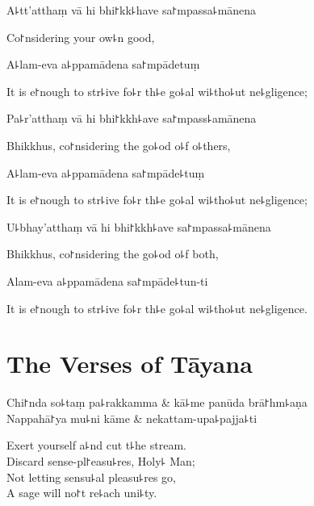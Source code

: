 A꜕tt'atthaṃ vā hi bhi꜓kk꜕have sa꜓mpassa꜕mānena

\begin{english}
  Co꜓nsidering your ow꜕n good,
\end{english}

A꜕lam-eva a꜕ppamādena sa꜓mpādetuṃ

\begin{english}
  It is e꜓nough to str꜕ive fo꜕r th꜕e go꜕al wi꜕tho꜕ut ne꜕gligence;
\end{english}

Pa꜕r'atthaṃ vā hi bhi꜓kkh꜕ave sa꜓mpass꜕amānena

\begin{english}
  Bhikkhus, co꜓nsidering the go꜕od o꜕f o꜕thers,
\end{english}

A꜕lam-eva a꜕ppamādena sa꜓mpāde꜕tuṃ

\begin{english}
  It is e꜓nough to str꜕ive fo꜕r th꜕e go꜕al wi꜕tho꜕ut ne꜕gligence;
\end{english}

U꜕bhay'atthaṃ vā hi bhi꜓kkh꜕ave sa꜓mpassa꜕mānena

\begin{english}
  Bhikkhus, co꜓nsidering the go꜕od o꜕f both,
\end{english}

Alam-eva a꜕ppamādena sa꜓mpāde꜕tun-ti

\begin{english}
  It is e꜓nough to str꜕ive fo꜕r th꜕e go꜕al wi꜕tho꜕ut ne꜕gligence.
\end{english}

\chapter{The Verses of Tāyana}%


\begin{leader}
\end{leader}

\begin{twochants}
  Chi꜓nda so꜕taṃ pa꜕rakkamma & kā꜕me panūda brā꜓hm꜕aṇa \\
  Nappahā꜓ya mu꜕ni kāme & nekattam-upa꜕pajja꜕ti \\
\end{twochants}

\begin{english}
  Exert yourself a꜕nd cut t꜕he stream.\\
  Discard sense-pl꜓easu꜕res, Holy꜕ Man;\\
  Not letting sensu꜕al pleasu꜕res go,\\
  A sage will no꜓t re꜕ach uni꜕ty.
\end{english}

